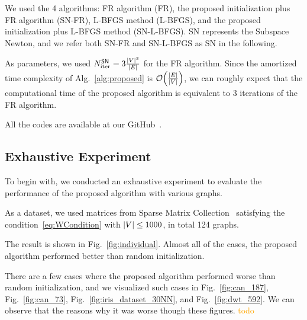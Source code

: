 \documentclass[dvipdfmx,journal]{IEEEtran}
\newcommand{\orange}[1]{\textcolor{orange}{#1}}
\begin{document}
We used the 4 algorithms: FR algorithm (\textsf{FR}), the proposed initialization plus FR algorithm (\textsf{SN-FR}), L-BFGS method (\textsf{L-BFGS}), and the proposed initialization plus L-BFGS method (\textsf{SN-L-BFGS}). \textsf{SN} represents the Subspace Newton, and we refer both \textsf{SN-FR} and \textsf{SN-L-BFGS} as \textsf{SN} in the following.

As parameters, we used $N_\mathrm{iter}^\mathsf{SN} = 3 \frac{\abs{V}^3}{\abs{E}}$ for the FR algorithm. Since the amortized time complexity of
Alg.~\ref{alg:proposed} is $\order{\frac{\abs{E}}{\abs{V}}}$, we can roughly expect that the computational time of the proposed algorithm is equivalent to 3 iterations of the FR algorithm.

All the codes are available at our GitHub~\cite{ThisPaperGitHub}.

\subsection{Exhaustive Experiment}\label{ssec:exprAll}

To begin with, we conducted an exhaustive experiment to evaluate the performance of the proposed algorithm with various graphs.

As a dataset, we used matrices from Sparse Matrix Collection~\cite{davis2011university} satisfying the condition~\eqref{eq:WCondition} with $\abs{V} \leq 1000$, in total 124 graphs.

The result is shown in Fig.~\ref{fig:individual}.
Almost all of the cases, the proposed algorithm performed better than random initialization.

There are a few cases where the proposed algorithm performed worse than random initialization, and we visualized such cases in Fig.~\ref{fig:can_187}, Fig.~\ref{fig:can_73}, Fig.~\ref{fig:iris_dataset_30NN}, and Fig.~\ref{fig:dwt_592}.
We can observe that the reasons why it was worse though these figures. \orange{todo}
\end{document}
